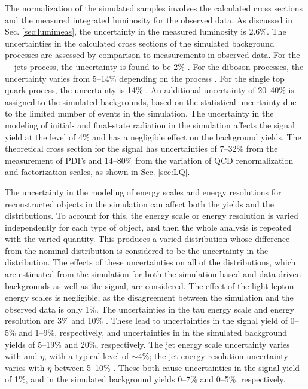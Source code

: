 The normalization of the simulated samples involves the calculated cross sections and the measured integrated luminosity for the observed data. As discussed in Sec. \ref{sec:lumimeas}, the uncertainty in the measured luminosity is 2.6\%. The uncertainties in the calculated cross sections of the simulated background processes are assessed by comparison to measurements in observed data. For the \Z + jets process, the uncertainty is found to be 2\% \cite{PhysRevLett.112.191802}. For the diboson processes, the uncertainty varies from 5--14\% depending on the process \cite{WZxsec}. For the single top quark process, the uncertainty is 14\% \cite{CMS-PAS-TOP-2012-002}. An additional uncertainty of 20--40\% is assigned to the simulated backgrounds, based on the statistical uncertainty due to the limited number of events in the simulation. The uncertainty in the modeling of initial- and final-state radiation in the simulation affects the signal yield at the level of 4\% and has a negligible effect on the background yields. The theoretical cross section for the signal has uncertainties of 7--32\% from the measurement of PDFs and 14--80\% from the variation of QCD renormalization and factorization scales, as shown in Sec. \ref{sec:LQ}.

The uncertainty in the modeling of energy scales and energy resolutions for reconstructed objects in the simulation can affect both the yields and the \ST distributions. To account for this, the energy scale or energy resolution is varied independently for each type of object, and then the whole analysis is repeated with the varied quantity. This produces a varied \ST distribution whose difference from the nominal \ST distribution is considered to be the uncertainty in the distribution. The effects of these uncertainties on all of the \ST distributions, which are estimated from the simulation for both the simulation-based and data-driven backgrounds as well as the signal, are considered. The effect of the light lepton energy scales is negligible, as the disagreement between the simulation and the observed data is only 1\%. The uncertainties in the tau energy scale and energy resolution are 3\% and 10\% \cite{TauID}. These lead to uncertainties in the signal yield of 0--5\% and 1--9\%, respectively, and uncertainties in in the simulated background yields of 5--19\% and 20\%, respectively. The jet energy scale uncertainty varies with \pt and $\eta$, with a typical level of ${\sim}4\%$; the jet energy resolution uncertainty varies with $\eta$ between 5--10\% \cite{CMS-JEC,CMS-DP-2013-033}. These both cause uncertainties in the signal yield of 1\%, and in the simulated background yields 0--7\% and 0--5\%, respectively.